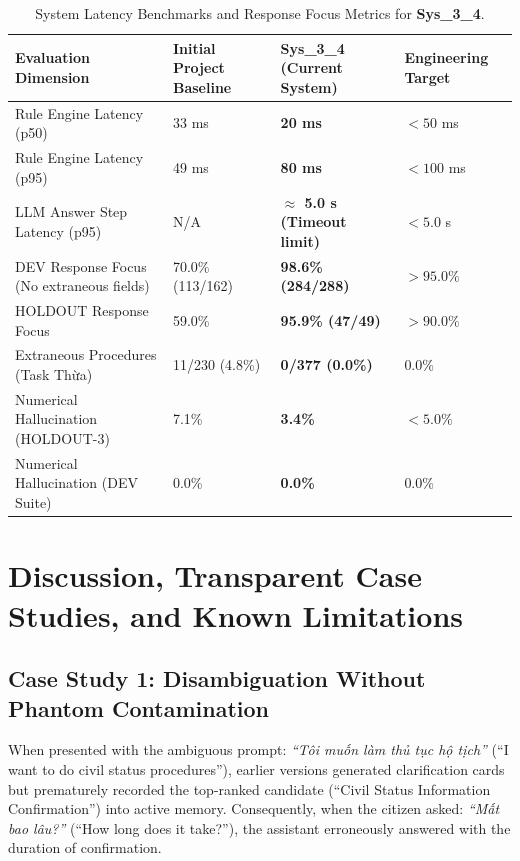 \documentclass[11pt,a4paper]{article}
\begin{document}
\begin{table}[htbp]
\centering
\caption{System Latency Benchmarks and Response Focus Metrics for \textbf{Sys\_3\_4}.}
\label{tab:latency_focus}
\small
\renewcommand{\arraystretch}{1.15}
\begin{tabularx}{\linewidth}{l Y Z Z}
\toprule
\textbf{Evaluation Dimension} & \textbf{Initial Project Baseline} & \textbf{Sys\_3\_4 (Current System)} & \textbf{Engineering Target} \\
\midrule
Rule Engine Latency (p50) & 33 ms & \textbf{20 ms} & $<50$ ms \\
Rule Engine Latency (p95) & 49 ms & \textbf{80 ms} & $<100$ ms \\
LLM Answer Step Latency (p95) & N/A & \textbf{$\approx$ 5.0 s (Timeout limit)} & $<5.0$ s \\
\midrule
DEV Response Focus (No extraneous fields) & 70.0\% (113/162) & \textbf{98.6\% (284/288)} & $>95.0\%$ \\
HOLDOUT Response Focus & 59.0\% & \textbf{95.9\% (47/49)} & $>90.0\%$ \\
Extraneous Procedures (Task Thừa) & 11/230 (4.8\%) & \textbf{0/377 (0.0\%)} & 0.0\% \\
Numerical Hallucination (HOLDOUT-3) & 7.1\% & \textbf{3.4\%} & $<5.0\%$ \\
Numerical Hallucination (DEV Suite) & 0.0\% & \textbf{0.0\%} & 0.0\% \\
\bottomrule
\end{tabularx}
\end{table}

\section{Discussion, Transparent Case Studies, and Known Limitations}

\subsection{Case Study 1: Disambiguation Without Phantom Contamination}
When presented with the ambiguous prompt: \textit{``Tôi muốn làm thủ tục hộ tịch''} (``I want to do civil status procedures''), earlier versions generated clarification cards but prematurely recorded the top-ranked candidate (``Civil Status Information Confirmation'') into active memory. Consequently, when the citizen asked: \textit{``Mất bao lâu?''} (``How long does it take?''), the assistant erroneously answered with the duration of confirmation. 
\end{document}
